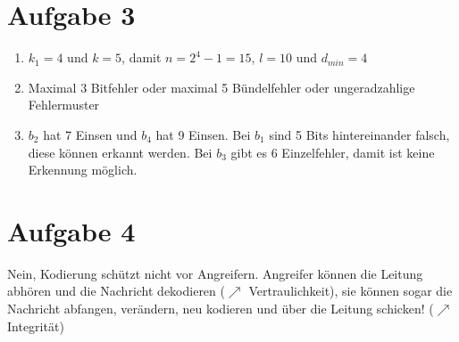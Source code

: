 \documentclass{article}
\begin{document}
	\section*{Aufgabe 3}
	\begin{enumerate}[label=(\alph*)]
		\item $k_1=4$ und $k=5$, damit $n = 2^4-1 = 15$, $l = 10$ und $d_{min} = 4$
		\item Maximal 3 Bitfehler oder maximal 5 Bündelfehler oder ungeradzahlige Fehlermuster
		\item $b_2$ hat 7 Einsen und $b_4$ hat 9 Einsen. Bei $b_1$ sind 5 Bits hintereinander falsch, diese können erkannt werden. Bei $b_3$ gibt es 6 Einzelfehler, damit ist keine Erkennung möglich.
	\end{enumerate}
	
	\section*{Aufgabe 4}
	Nein, Kodierung schützt nicht vor Angreifern. Angreifer können die Leitung abhören und die Nachricht dekodieren ($\nearrow$ Vertraulichkeit), sie können sogar die Nachricht abfangen, verändern, neu kodieren und über die Leitung schicken! ($\nearrow$ Integrität)
\end{document}
